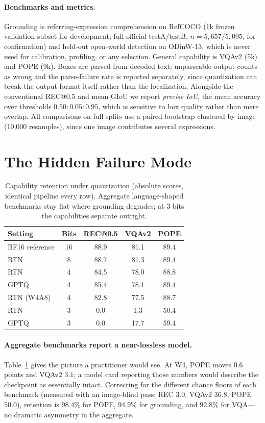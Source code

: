 \documentclass[letterpaper]{article} %
\begin{document}
\paragraph{Benchmarks and metrics.} Grounding is referring-expression comprehension on RefCOCO (1k frozen validation subset for development; full official testA/testB, $n = 5{,}657/5{,}095$, for confirmation) and held-out open-world detection on ODinW-13, which is never used for calibration, profiling, or any selection. General capability is VQAv2 (5k) and POPE (9k). Boxes are parsed from decoded text; unparseable output counts as wrong and the parse-failure rate is reported separately, since quantization can break the output format itself rather than the localization. Alongside the conventional REC@0.5 and mean GIoU we report \emph{precise IoU}, the mean accuracy over thresholds $0.50{:}0.05{:}0.95$, which is sensitive to box quality rather than mere overlap. All comparisons on full splits use a paired bootstrap clustered by image (10{,}000 resamples), since one image contributes several expressions.

\section{The Hidden Failure Mode}

\begin{table}[t]
\centering
\small
\caption{Capability retention under quantization (absolute scores, identical pipeline every row). Aggregate language-shaped benchmarks stay flat where grounding degrades; at 3 bits the capabilities separate outright.}
\label{tab:grid}
\begin{tabular}{lcccc}
\toprule
Setting & Bits & REC@0.5 & VQAv2 & POPE \\
\midrule
BF16 reference & 16 & 88.9 & 81.1 & 89.4 \\
RTN & 8 & 88.7 & 81.3 & 89.4 \\
\midrule
RTN & 4 & 84.5 & 78.0 & 88.8 \\
GPTQ & 4 & 85.4 & 78.1 & 89.4 \\
RTN (W4A8) & 4 & 82.8 & 77.5 & 88.7 \\
\midrule
RTN & 3 & 0.0 & 1.3 & 50.4 \\
GPTQ & 3 & 0.0 & 17.7 & 59.4 \\
\bottomrule
\end{tabular}
\end{table}

\paragraph{Aggregate benchmarks report a near-lossless model.} Table~\ref{tab:grid} gives the picture a practitioner would see. At W4, POPE moves $0.6$ points and VQAv2 $3.1$; a model card reporting those numbers would describe the checkpoint as essentially intact. Correcting for the different chance floors of each benchmark (measured with an image-blind pass: REC $3.0$, VQAv2 $36.8$, POPE $50.0$), retention is $98.4\%$ for POPE, $94.9\%$ for grounding, and $92.8\%$ for VQA---no dramatic asymmetry in the aggregate.
\end{document}
